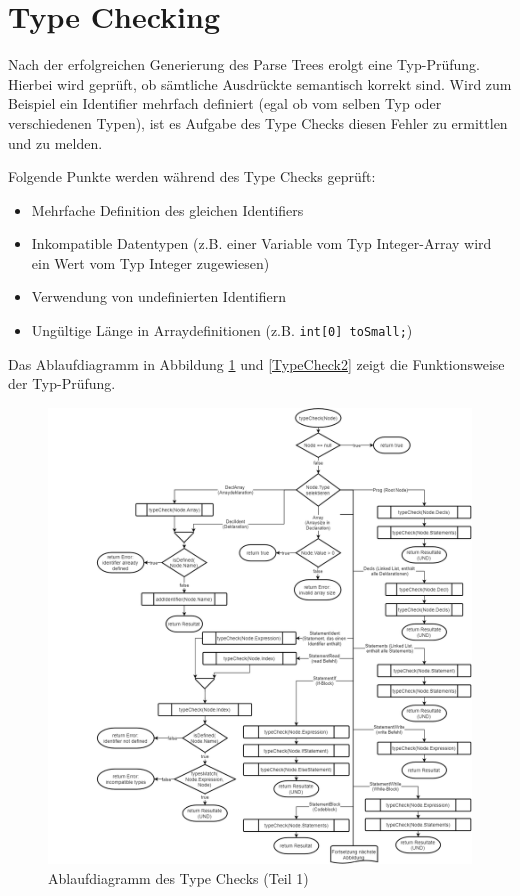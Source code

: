 \documentclass[
a4paper
]{scrreprt}
\begin{document}
\section{Type Checking}
Nach der erfolgreichen Generierung des Parse Trees erolgt eine Typ-Prüfung. Hierbei wird geprüft, ob sämtliche Ausdrückte semantisch korrekt sind. Wird zum Beispiel ein Identifier mehrfach definiert (egal ob vom selben Typ oder verschiedenen Typen), ist es Aufgabe des Type Checks diesen Fehler zu ermittlen und zu melden.

Folgende Punkte werden während des Type Checks geprüft:
\begin{itemize}
\item Mehrfache Definition des gleichen Identifiers
\item Inkompatible Datentypen (z.B. einer Variable vom Typ Integer-Array wird ein Wert vom Typ Integer zugewiesen)
\item Verwendung von undefinierten Identifiern
\item Ungültige Länge in Arraydefinitionen (z.B. \lstinline{int[0] toSmall;})
\end{itemize}

Das Ablaufdiagramm in Abbildung \ref{TypeCheck1} und \ref{TypeCheck2} zeigt die Funktionsweise der Typ-Prüfung.

\begin{figure}[htbp]
\centering
\includegraphics[width=\textwidth]{./images/TypeCheck1.png}
\caption{Ablaufdiagramm des Type Checks (Teil 1)}
\label{TypeCheck1}
\end{figure}
\end{document}
